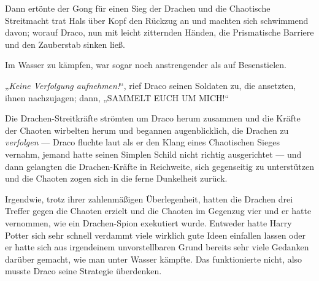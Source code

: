 Dann ertönte der Gong für einen Sieg der Drachen und die Chaotische Streitmacht trat Hals über Kopf den Rückzug an und machten sich schwimmend davon; worauf Draco, nun mit leicht zitternden Händen, die Prismatische Barriere und den Zauberstab sinken ließ.

Im Wasser zu kämpfen, war sogar noch anstrengender als auf Besenstielen.

„\emph{Keine Verfolgung aufnehmen!}“, rief Draco seinen Soldaten zu, die ansetzten, ihnen nachzujagen; dann, 
„SAMMELT EUCH UM MICH!“

Die Drachen-Streitkräfte strömten um Draco herum zusammen und die Kräfte der Chaoten wirbelten herum und begannen augenblicklich, die Drachen zu \emph{verfolgen} — Draco fluchte laut als er den Klang eines Chaotischen Sieges vernahm, jemand hatte seinen Simplen Schild nicht richtig ausgerichtet — und dann gelangten die Drachen-Kräfte in Reichweite, sich gegenseitig zu unterstützen und die Chaoten zogen sich in die ferne Dunkelheit zurück.

Irgendwie, trotz ihrer zahlenmäßigen Überlegenheit, hatten die Drachen drei Treffer gegen die Chaoten erzielt und die Chaoten im Gegenzug vier und er hatte vernommen, wie ein Drachen-Spion exekutiert wurde. Entweder hatte Harry Potter sich sehr schnell verdammt viele wirklich gute Ideen einfallen lassen oder er hatte sich aus irgendeinem unvorstellbaren Grund bereits sehr viele Gedanken darüber gemacht, wie man unter Wasser kämpfte. Das funktionierte nicht, also musste Draco seine Strategie überdenken.


